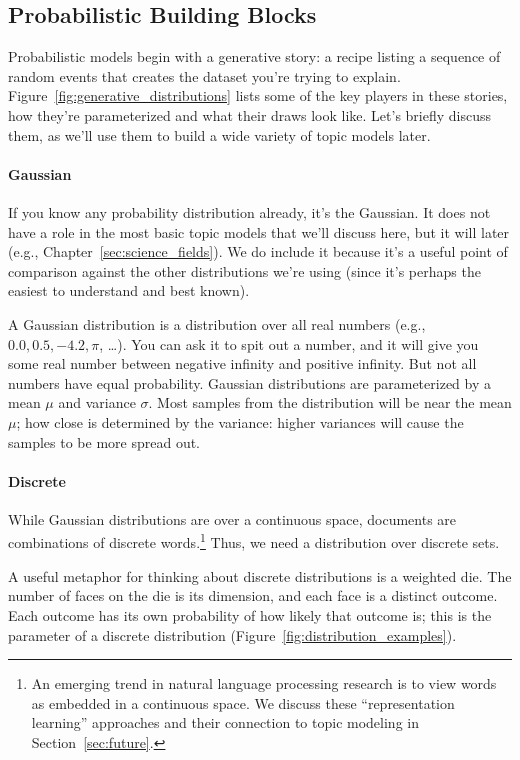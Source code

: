 \subsection{Probabilistic Building Blocks}
\label{sec:intro_building_blocks}

Probabilistic models begin with a generative story: a recipe listing a sequence of random events
that creates the dataset you're trying to explain.
Figure~\ref{fig:generative_distributions} lists some of the key players in these
stories, how they're parameterized and what their draws look like.  Let's
briefly discuss them, as we'll use them to build a wide variety of topic models
later.

\paragraph{Gaussian} If you know any probability distribution already, it's the
Gaussian.  It does not have a role in the most basic topic models that we'll
discuss here, but it will later (e.g., Chapter~\ref{sec:science_fields}).  We do
include it because it's a useful point of comparison against the other
distributions we're using (since it's perhaps the easiest to understand and best
known).

A Gaussian distribution is a distribution over all real numbers (e.g., $0.0, 0.5,
-4.2, \pi$, \dots).  You can ask it to spit out a number, and it will give you
some real number between negative infinity and positive infinity.  But not all
numbers have equal probability.  Gaussian distributions are parameterized by a
mean $\mu$ and variance $\sigma$.  Most samples from the distribution will be
near the mean $\mu$; how close is determined by the variance: higher variances
will cause the samples to be more spread out.

\paragraph{Discrete}

While Gaussian distributions are over a continuous space, documents are
combinations of discrete words.\footnote{An emerging trend in natural language
  processing research is to view words as embedded in a continuous space.  We
  discuss these ``representation learning'' approaches and their connection to
  topic modeling in Section~\ref{sec:future}.}   Thus, we need a distribution
over discrete sets.

A useful metaphor for thinking about discrete distributions is a weighted die.
The number of faces on the die is its dimension, and each face is a distinct
outcome.  Each outcome has its own probability of how likely that outcome is;
this is the parameter of a discrete distribution
(Figure~\ref{fig:distribution_examples}).

